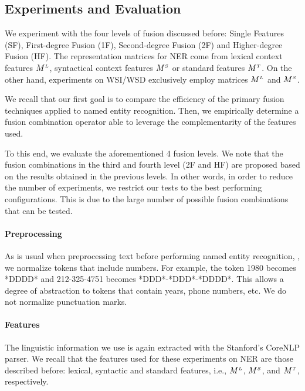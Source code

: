 \subsection{Experiments and Evaluation}
\label{chap6:expes}

We experiment with the four levels of fusion discussed before: Single Features (SF), First-degree Fusion (1F), Second-degree Fusion (2F) and Higher-degree Fusion (HF). The representation matrices for NER come from lexical context features $M^{\scriptscriptstyle L}$, syntactical context features $M^{\scriptscriptstyle S}$ or standard features $M^{\scriptscriptstyle T}$.  On the other hand, experiments on WSI/WSD exclusively employ matrices $M^{\scriptscriptstyle L}$ and $M^{\scriptscriptstyle S}$.

We recall that our first goal is to compare the efficiency of the primary  fusion techniques applied to   named entity recognition. Then, we empirically determine a fusion combination operator able to leverage the complementarity of the features used.

To this end, we evaluate the aforementioned 4 fusion levels. We note that the fusion combinations in the third and fourth level (2F and HF) are proposed based on the results obtained in the previous levels. In other words, in order to reduce the number of experiments, we restrict our tests to the best performing configurations. This is due to the large number of possible fusion combinations that can be tested.



\paragraph{Preprocessing}

As is usual when preprocessing text before performing named entity recognition, \cite{RatinovR09}, we normalize tokens that include numbers. For example, the token 1980 becomes *DDDD* and 212-325-4751 becomes *DDD*-*DDD*-*DDDD*. This allows a degree of abstraction to tokens that contain years, phone numbers, etc. We do not normalize punctuation marks.

\paragraph{Features}
The linguistic information we use is again extracted with the Stanford's CoreNLP parser. We recall that the features used for these experiments on NER are those described before: lexical, syntactic and standard features, i.e., $M^{\scriptscriptstyle L}$, $M^{\scriptscriptstyle S}$, and $M^{\scriptscriptstyle T}$, respectively. 

